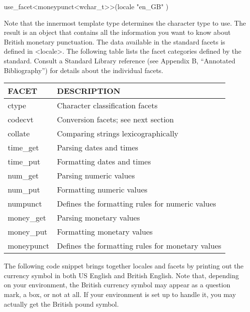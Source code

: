 \begin{cpp}
use_facet<moneypunct<wchar_t>>(locale { "en_GB" })
\end{cpp}

Note that the innermost template type determines the character type to use. The result is an object that contains all the information you want to know about British monetary punctuation. The data available in the standard facets is defined in <locale>. The following table lists the facet categories defined by the standard. Consult a Standard Library reference (see Appendix B, “Annotated Bibliography”) for details about the individual facets.

\begin{longtable}{|l|l|}
\hline
\textbf{FACET} & \textbf{DESCRIPTION}                             \\ \hline
\endfirsthead
%
\endhead
%
ctype          & Character classification facets                  \\ \hline
codecvt        & Conversion facets; see next section              \\ \hline
collate        & Comparing strings lexicographically              \\ \hline
time\_get      & Parsing dates and times                          \\ \hline
time\_put      & Formatting dates and times                       \\ \hline
num\_get       & Parsing numeric values                           \\ \hline
num\_put       & Formatting numeric values                        \\ \hline
numpunct       & Defines the formatting rules for numeric values  \\ \hline
money\_get     & Parsing monetary values                          \\ \hline
money\_put     & Formatting monetary values                       \\ \hline
moneypunct     & Defines the formatting rules for monetary values \\ \hline
\end{longtable}

The following code snippet brings together locales and facets by printing out the currency symbol in both US English and British English. Note that, depending on your environment, the British currency symbol may appear as a question mark, a box, or not at all. If your environment is set up to handle it, you may actually get the British pound symbol.

